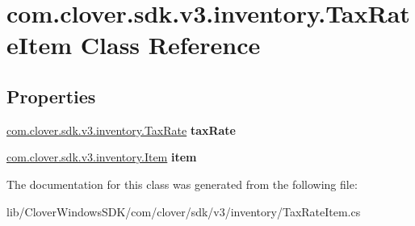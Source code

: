 \hypertarget{classcom_1_1clover_1_1sdk_1_1v3_1_1inventory_1_1_tax_rate_item}{}\section{com.\+clover.\+sdk.\+v3.\+inventory.\+Tax\+Rate\+Item Class Reference}
\label{classcom_1_1clover_1_1sdk_1_1v3_1_1inventory_1_1_tax_rate_item}
\subsection*{Properties}
\begin{DoxyCompactItemize}
\item 
\mbox{\label{classcom_1_1clover_1_1sdk_1_1v3_1_1inventory_1_1_tax_rate_item_a7003ea33a4a4bbd1f03d1149d44269ed}} 
\hyperlink{classcom_1_1clover_1_1sdk_1_1v3_1_1inventory_1_1_tax_rate}{com.\+clover.\+sdk.\+v3.\+inventory.\+Tax\+Rate} {\bfseries tax\+Rate}
\item 
\mbox{\label{classcom_1_1clover_1_1sdk_1_1v3_1_1inventory_1_1_tax_rate_item_a21184b4929531cc3358426a16a4ccb3d}} 
\hyperlink{classcom_1_1clover_1_1sdk_1_1v3_1_1inventory_1_1_item}{com.\+clover.\+sdk.\+v3.\+inventory.\+Item} {\bfseries item}
\end{DoxyCompactItemize}


The documentation for this class was generated from the following file\+:\begin{DoxyCompactItemize}
\item 
lib/\+Clover\+Windows\+S\+D\+K/com/clover/sdk/v3/inventory/Tax\+Rate\+Item.\+cs\end{DoxyCompactItemize}
